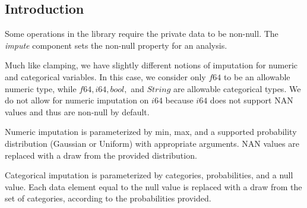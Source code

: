 \documentclass[11pt]{scrartcl} %
\begin{document}
\subsection{Introduction}
Some operations in the library require the private data to be non-null. The \emph{impute} component 
sets the non-null property for an analysis. \newline 

Much like clamping, we have slightly different notions of imputation for numeric and categorical variables.
In this case, we consider only $f64$ to be an allowable numeric type, while
$f64, i64, bool,$ and $String$ are allowable categorical types. We do not allow for numeric imputation on $i64$
because $i64$ does not support NAN values and thus are non-null by default. \newline

Numeric imputation is parameterized by min, max, and a supported probability distribution (Gaussian or Uniform)
with appropriate arguments. NAN values are replaced with a draw from the provided distribution. \newline

Categorical imputation is parameterized by categories, probabilities, and a null value.
Each data element equal to the null value is replaced with a draw from the set of categories,
according to the probabilities provided.
\end{document}
